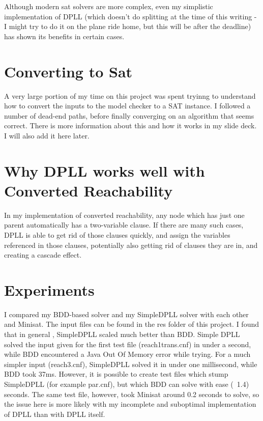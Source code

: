 \documentclass[11pt]{article}
\begin{document}
\begin{flushleft}
Although modern sat solvers are more complex, even my simplistic implementation of DPLL (which doesn't do splitting at the time of this writing - I might try to do it on the plane ride home, but this will be after the deadline) has shown its benefits in certain cases.

\section{Converting to Sat} A very large portion of my time on this project was spent tryinng to understand how to convert the inputs to the model checker to a SAT instance. I followed a number of dead-end paths, before finally converging on an algorithm that seems correct. There is more information about this and how it works in my slide deck. I will also add it here later.

\section{Why DPLL works well with Converted Reachability} In my implementation of converted reachability, any node which has just one parent automatically has a two-variable clause. If there are many such cases, DPLL is able to get rid of those clauses quickly, and assign the variables referenced in those clauses, potentially also getting rid of clauses they are in, and creating a cascade effect. 

\section{Experiments}
I compared my BDD-based solver and my SimpleDPLL solver with each other and Minisat. The input files can be found in the res folder of this project. I found that in general , SimpleDPLL scaled much better than BDD. Simple DPLL solved the input given for the first test file (reach1trans.cnf) in under a second, while BDD encountered a Java Out Of Memory error while trying. For a much simpler input (reach3.cnf), SimpleDPLL solved it in under one millisecond, while BDD took 37ms.  However, it is possible to create test files which stump SimpleDPLL (for example par.cnf), but which BDD can solve with ease (~1.4) seconds. The same test file, however, took Minisat around 0.2 seconds to solve, so the issue here is more likely with my incomplete and suboptimal implementation of DPLL than with DPLL itself.

\end{flushleft}
\end{document}
